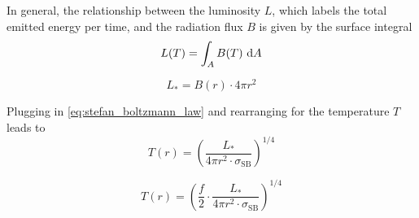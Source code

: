     In general, the relationship between the luminosity $L$, which labels the total emitted energy 
    per time, and the radiation flux $B$ is given by the surface integral
    \begin{equation}
        L(T) = \int_A B(T) \ \text dA
    \end{equation}


    
    \begin{equation}
        L_* = B(r) \cdot 4\pi r^2
    \end{equation}

    Plugging in \cref{eq:stefan_boltzmann_law} and rearranging for the temperature $T$ leads to
    \begin{equation}
        T(r) = \left(
            \frac{L_*}{4\pi r^2 \cdot \sigma_\text{SB}}
        \right)^{1/4}
    \end{equation}

    \begin{equation}
    \boxed{
        T(r) = \left(
            \frac{f}{2}\cdot
            \frac{L_*}{4\pi r^2 \cdot \sigma_\text{SB}}
        \right)^{1/4}
    }
    \end{equation}

    


